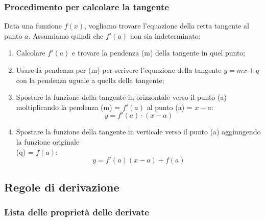 \documentclass{article}
\begin{document}
\subsubsection{Procedimento per calcolare la tangente}

Data una funzione \(f(x)\), vogliamo trovare l'equazione della retta tangente al punto \(a\).
Assumiamo quindi che \(f'(a)\) non sia indeterminato:
\begin{enumerate}
    \item Calcolare \(f'(a)\) e trovare la pendenza (m) della tangente in quel punto;
    \item Usare la pendenza per (m) per scrivere l'equazione della tangente
        \(y=mx+q\) con la pendenza uguale a quella della tangente;
    \item Spostare la funzione della tangente in orizzontale verso il punto (a)
        moltiplicando la pendenza (m) = \(f'(a)\) al punto (a) = \(x-a\): 
        \begin{equation*}
            y=f'(a)\cdot (x-a)
        \end{equation*}
    \item Spostare la funzione della tangente in verticale verso il punto (a)
        aggiungendo la funzione originale\\ (q) = \(f(a)\): 
        \begin{equation*}
            y=f'(a)(x-a)+f(a)
        \end{equation*}
\end{enumerate}

\newpage

\subsection{Regole di derivazione}

\subsubsection{Lista delle proprietà delle derivate}
\end{document}

